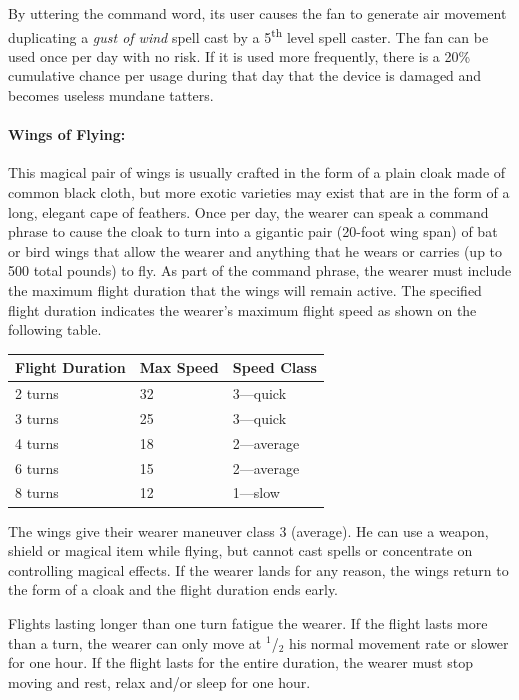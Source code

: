 \begin{multicols}{2}
By uttering the command word, its user causes the fan to generate air movement duplicating a \textit{gust of wind} spell cast by a 5\textsuperscript{th} level spell caster.  The fan can be used once per day with no risk.  If it is used more frequently, there is a 20\% cumulative chance per usage during that day that the device is damaged and becomes useless mundane tatters.

\paragraph{Wings of Flying:} This magical pair of wings is usually crafted in the form of a plain cloak made of common black cloth, but more exotic varieties may exist that are in the form of a long, elegant cape of feathers.  Once per day, the wearer can speak a command phrase to cause the cloak to turn into a gigantic pair (20-foot wing span) of bat or bird wings that allow the wearer and anything that he wears or carries (up to 500 total pounds) to fly.  As part of the command phrase, the wearer must include the maximum flight duration that the wings will remain active.  The specified flight duration indicates the wearer's maximum flight speed as shown on the following table.

\noindent \begin{tabular}{|p{}|p{}|p{}|}
\hline
Flight Duration	& Max Speed	& Speed Class \\
\hline\hline
\rowcolor[gray]{.9}2 turns	& 32	& 3---quick \\
3 turns	& 25	& 3---quick \\
\rowcolor[gray]{.9}4 turns	& 18	& 2---average \\
6 turns	& 15	& 2---average \\
\rowcolor[gray]{.9}8 turns	& 12	& 1---slow \\
\hline
\end{tabular}

The wings give their wearer maneuver class 3 (average).  He can use a weapon, shield or magical item while flying, but cannot cast spells or concentrate on controlling magical effects.  If the wearer lands for any reason, the wings return to the form of a cloak and the flight duration ends early.  

Flights lasting longer than one turn fatigue the wearer.  If the flight lasts more than a turn, the wearer can only move at $^1$/$_2$ his normal movement rate or slower for one hour.  If the flight lasts for the entire duration, the wearer must stop moving and rest, relax and/or sleep for one hour. 


\end{multicols}
